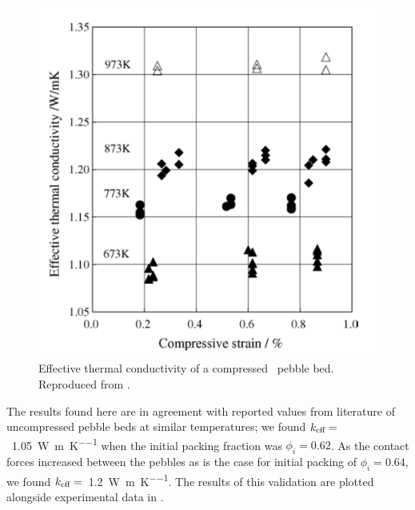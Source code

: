 \begin{figure}[ht]
\centering
    \includegraphics[width=\singleimagewidth]{figures/tanigawa.png}
    \caption{Effective thermal conductivity of a compressed \lit~pebble bed. Reproduced from \cite{Tanigawa2005801}.}
    \label{fig:tanigawa}
\end{figure}

The results found here are in agreement with reported values from literature of uncompressed pebble beds at similar temperatures;\cite{Hatano2003} we found $k_\text{eff} =$~\SI{1.05}{\watt\per\meter\per\kelvin} when the initial packing fraction was $\phi_i = 0.62$. As the contact forces increased between the pebbles as is the case for initial packing of $\phi_i = 0.64$, we found $k_\text{eff} =$~\SI{1.2}{\watt\per\meter\per\kelvin}. The results of this validation are plotted alongside experimental data in .


